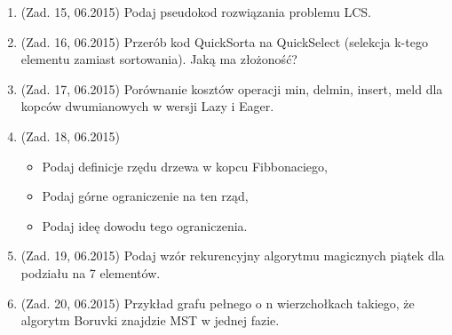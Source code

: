 \documentclass[10pt]{article}%
\begin{document}
\begin{enumerate}
\item (Zad. 15, 06.2015) Podaj pseudokod rozwiązania problemu LCS.
\item (Zad. 16, 06.2015) Przerób kod QuickSorta na QuickSelect (selekcja k-tego elementu zamiast sortowania). Jaką ma złożoność?
\item (Zad. 17, 06.2015) Porównanie kosztów operacji { min, delmin, insert, meld } dla kopców dwumianowych w wersji Lazy i Eager.
\item (Zad. 18, 06.2015) 
\begin{itemize}
\item Podaj definicje rzędu drzewa w kopcu Fibbonaciego, 
\item Podaj górne ograniczenie na ten rząd, 
\item Podaj ideę dowodu tego ograniczenia. 
\end{itemize}
\item (Zad. 19, 06.2015) Podaj wzór rekurencyjny algorytmu magicznych piątek dla podziału na 7 elementów. 
\item (Zad. 20, 06.2015) Przykład grafu pełnego o n wierzchołkach takiego, że algorytm Boruvki znajdzie MST w jednej fazie.
\end{enumerate}
\end{document}
